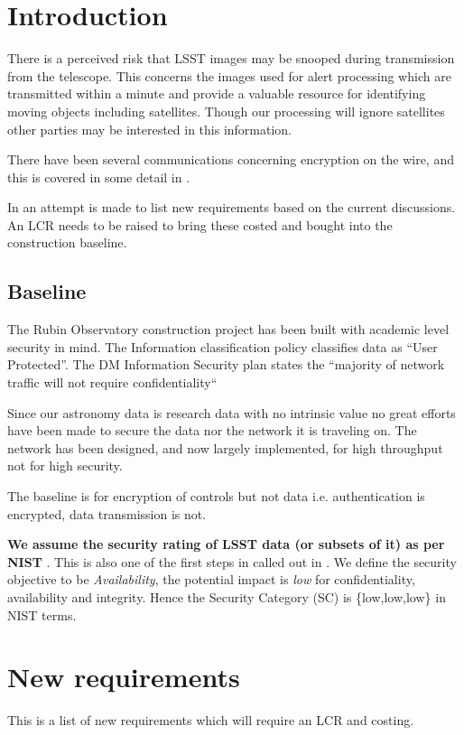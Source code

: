 \section{Introduction} \label{sec:intro}

There is a perceived  risk that LSST  images may be snooped during transmission from the telescope. This concerns the images used for alert processing which are transmitted within a minute and provide a valuable resource for identifying moving objects including satellites. Though our processing will ignore satellites other parties may be interested in this information.

There have been several communications concerning encryption on the wire, and this is covered in some detail in .

In  an attempt is made to list new requirements based on the current discussions.
An LCR needs to be raised to bring these costed and bought into the construction baseline.


\subsection{Baseline }
The Rubin Observatory construction project has been built with academic level security in mind.
The
 Information classification policy  classifies data as  “User Protected”.
The DM Information Security plan  states the “majority of network traffic will not require confidentiality“

Since our astronomy data is research data with no intrinsic value no great efforts have been made to secure the
data nor the network it is traveling on.
The network has been designed, and now largely implemented, for high throughput not for high security.

The baseline is for encryption of controls but not data i.e. authentication is encrypted, data transmission is not.

{\bf We assume the security rating of LSST data (or subsets of it) as per NIST }. This is also one of the first steps in  called out in .
We define the security objective to be \emph{Availability}, the potential impact is \emph{low} for confidentiality, availability and integrity. Hence the Security Category (SC) is \{low,low,low\} in NIST terms.


\section{New requirements} \label{sec:nr}
This is a list of new requirements which will require an LCR and costing.

